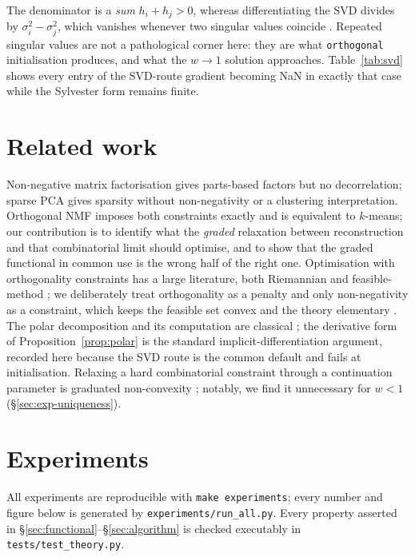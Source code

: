 \documentclass[11pt]{article}
\theoremstyle{definition}
\begin{document}
The denominator is a \emph{sum} $h_i + h_j > 0$, whereas differentiating the SVD
divides by $\sigma_i^2 - \sigma_j^2$, which vanishes whenever two singular values
coincide \citep{papadopoulo2000,ionescu2015}. Repeated singular values are not a
pathological corner here: they are what \texttt{orthogonal} initialisation
produces, and what the $w\to1$ solution approaches. Table~\ref{tab:svd} shows
every entry of the SVD-route gradient becoming NaN in exactly that case while the
Sylvester form remains finite.

\section{Related work}

Non-negative matrix factorisation \citep{lee1999} gives parts-based factors but
no decorrelation; sparse PCA \citep{zou2006} gives sparsity without
non-negativity or a clustering interpretation. Orthogonal NMF
\citep{ding2006,choi2008,pompili2014} imposes both constraints exactly and is
equivalent to $k$-means; our contribution is to identify what the \emph{graded}
relaxation between reconstruction and that combinatorial limit should optimise,
and to show that the graded functional in common use is the wrong half of the
right one. Optimisation with orthogonality constraints has a large literature,
both Riemannian \citep{absil2008} and feasible-method
\citep{wen2013}; we deliberately treat orthogonality as a penalty and only
non-negativity as a constraint, which keeps the feasible set convex and the
theory elementary \citep{beck2017,birgin2000}. The polar decomposition and its
computation are classical \citep{higham1986,higham2008}; the derivative form of
Proposition~\ref{prop:polar} is the standard implicit-differentiation argument,
recorded here because the SVD route is the common default and fails at
initialisation. Relaxing a hard combinatorial constraint through a continuation
parameter is graduated non-convexity \citep{blake1987}; notably, we find it
unnecessary for $w<1$ (\S\ref{sec:exp-uniqueness}).

\section{Experiments}\label{sec:experiments}

All experiments are reproducible with \texttt{make experiments}; every number and
figure below is generated by \texttt{experiments/run\_all.py}. Every property
asserted in \S\ref{sec:functional}--\S\ref{sec:algorithm} is checked executably
in \texttt{tests/test\_theory.py}.
\end{document}
